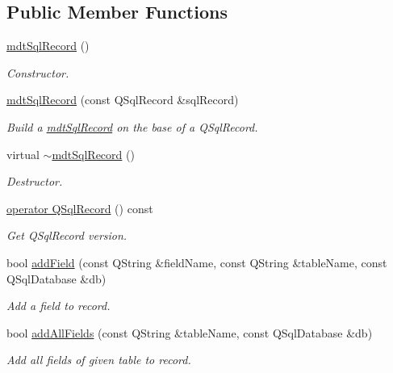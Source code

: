 \subsection*{Public Member Functions}
\begin{DoxyCompactItemize}
\item 
\hyperlink{classmdt_sql_record_a1b171d11ee1b270df4f56007c5609699}{mdt\-Sql\-Record} ()
\begin{DoxyCompactList}\small\item\em Constructor. \end{DoxyCompactList}\item 
\hyperlink{classmdt_sql_record_a6b658e74e8b1da998f610b7e8a731e0e}{mdt\-Sql\-Record} (const Q\-Sql\-Record \&sql\-Record)
\begin{DoxyCompactList}\small\item\em Build a \hyperlink{classmdt_sql_record}{mdt\-Sql\-Record} on the base of a Q\-Sql\-Record. \end{DoxyCompactList}\item 
virtual \hyperlink{classmdt_sql_record_af7e8c8cd4f7265853d746807e063396f}{$\sim$mdt\-Sql\-Record} ()
\begin{DoxyCompactList}\small\item\em Destructor. \end{DoxyCompactList}\item 
\hyperlink{classmdt_sql_record_a2bd403322d7ec1af284c2117a71d5e71}{operator Q\-Sql\-Record} () const 
\begin{DoxyCompactList}\small\item\em Get Q\-Sql\-Record version. \end{DoxyCompactList}\item 
bool \hyperlink{classmdt_sql_record_a7b144e9c00e46748e1729251aabd5f51}{add\-Field} (const Q\-String \&field\-Name, const Q\-String \&table\-Name, const Q\-Sql\-Database \&db)
\begin{DoxyCompactList}\small\item\em Add a field to record. \end{DoxyCompactList}\item 
bool \hyperlink{classmdt_sql_record_a878c551b98df2653d642ec01b0101495}{add\-All\-Fields} (const Q\-String \&table\-Name, const Q\-Sql\-Database \&db)
\begin{DoxyCompactList}\small\item\em Add all fields of given table to record. \end{DoxyCompactList}\item 

\end{DoxyCompactItemize}
